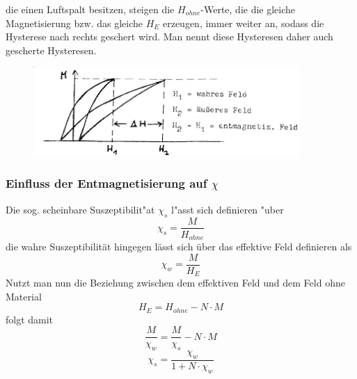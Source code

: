             die einen Luftspalt besitzen, steigen die $H_{ohne}$-Werte, die die gleiche Magnetisierung
            bzw. das gleiche $H_{E}$ erzeugen, immer weiter an, sodass die Hysterese nach rechts
            geschert wird. Man nennt diese Hysteresen daher auch gescherte Hysteresen.
            \begin{figure}
                \centering
                \includegraphics[width=0.9\textwidth]{Images/geschert.png}
            \end{figure}

        \subsubsection*{Einfluss der Entmagnetisierung auf $\chi$}
            Die sog. scheinbare Suszeptibilit"at $\chi_s$ l"asst sich definieren "uber
            \begin{equation}
                \chi_s = \frac{M}{H_{ohne}}
            \end{equation}
            die wahre Suszeptibilität hingegen lässt sich über das effektive Feld definieren als
            \begin{equation}
                \chi_w = \frac{M}{H_{E}}
            \end{equation}
            Nutzt man nun die Beziehung zwischen dem effektiven Feld und dem Feld ohne Material
            \begin{equation}
                H_E = H_{ohne} - N\cdot M
            \end{equation}
            folgt damit
            \begin{equation}
                \frac{M}{\chi_w} = \frac{M}{\chi_s} - N \cdot M
            \end{equation}
            \begin{equation}
                \chi_s = \frac{\chi_w}{1+N\cdot \chi_w}
            \end{equation}
